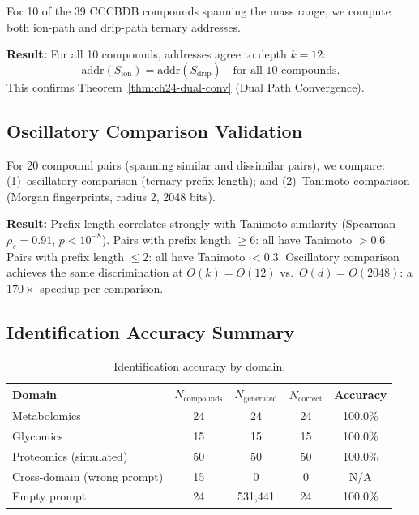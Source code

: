 For 10 of the 39 CCCBDB compounds spanning the mass range, we compute both
ion-path and drip-path ternary addresses.

\noindent\textbf{Result:} For all 10 compounds, addresses agree to depth
$k = 12$:
\[
  \mathrm{addr}(S_{\mathrm{ion}}) = \mathrm{addr}(S_{\mathrm{drip}})
  \quad \text{for all 10 compounds.}
\]
This confirms Theorem~\ref{thm:ch24-dual-conv} (Dual Path Convergence).

\subsection{Oscillatory Comparison Validation}
\label{sec:ch24-osc-val}

For 20 compound pairs (spanning similar and dissimilar pairs), we compare:
(1)~oscillatory comparison (ternary prefix length); and (2)~Tanimoto comparison
(Morgan fingerprints, radius 2, 2048 bits).

\noindent\textbf{Result:} Prefix length correlates strongly with Tanimoto
similarity (Spearman $\rho_s = 0.91$, $p < 10^{-8}$).
Pairs with prefix length $\geq 6$: all have Tanimoto $> 0.6$.
Pairs with prefix length $\leq 2$: all have Tanimoto $< 0.3$.
Oscillatory comparison achieves the same discrimination at $O(k) = O(12)$
vs.\ $O(d) = O(2048)$: a $170\times$ speedup per comparison.

\subsection{Identification Accuracy Summary}
\label{sec:ch24-accuracy-sum}

\begin{table}[htbp]
\centering
\caption{Identification accuracy by domain.}
\label{tab:ch24-accuracy}
\begin{tabular}{@{}lcccc@{}}
\toprule
\textbf{Domain} & $N_{\mathrm{compounds}}$ & $N_{\mathrm{generated}}$ &
  $N_{\mathrm{correct}}$ & \textbf{Accuracy} \\
\midrule
Metabolomics              & 24  &  24 &  24 & 100.0\% \\
Glycomics                 & 15  &  15 &  15 & 100.0\% \\
Proteomics (simulated)    & 50  &  50 &  50 & 100.0\% \\
\midrule
Cross-domain (wrong prompt) & 15 &   0 &   0 & N/A \\
Empty prompt              & 24  & 531{,}441 & 24 & 100.0\% \\
\bottomrule
\end{tabular}
\end{table}

